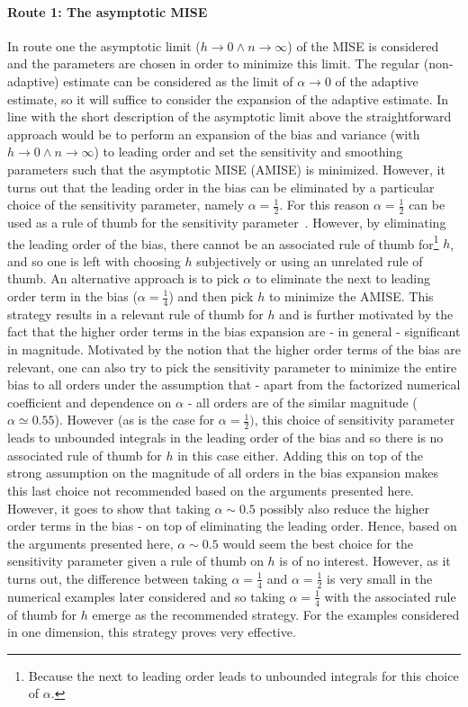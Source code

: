 \documentclass[
twoside,
openright,
titlepage,
numbers=noenddot,
headinclude,%
footinclude=true,
dottedtoc, %
ngerman,
american, %
pagesize=pdftex,
]{book}
\begin{document}
	\paragraph{Route 1: The asymptotic MISE}
	In route one the asymptotic limit ($h\rightarrow 0\wedge  n\rightarrow \infty$) of the MISE is considered and the parameters are chosen in order to minimize this limit. The regular (non-adaptive) estimate can be considered as the limit of $\alpha\rightarrow 0$ of the adaptive estimate, so it will suffice to consider the expansion of the adaptive estimate.\newline
	In line with the short description of the asymptotic limit above the straightforward approach would be to perform an expansion of the bias and variance (with $h\rightarrow 0\wedge  n\rightarrow \infty$) to leading order and set the sensitivity and smoothing parameters such that the asymptotic MISE (AMISE) is minimized. However, it turns out that the leading order in the bias can be eliminated by a particular choice of the sensitivity parameter, namely $\alpha=\frac{1}{2}$. For this reason $\alpha=\frac{1}{2}$ can be used as a rule of thumb for the sensitivity parameter~\citep{Silverman86}. However, by eliminating the leading order of the bias, there cannot be an associated rule of thumb for\footnote{Because the next to leading order leads to unbounded integrals for this choice of $\alpha$.} $h$, and so one is left with choosing $h$ subjectively or using an unrelated rule of thumb. An alternative approach is to pick $\alpha$ to eliminate the next to leading order term in the bias ($\alpha=\frac{1}{4}$) and then pick $h$ to minimize the AMISE. This strategy results in a relevant rule of thumb for $h$ and is further motivated by the fact that the higher order terms in the bias expansion are - in general - significant in magnitude. Motivated by the notion that the higher order terms of the bias are relevant, one can also try to pick the sensitivity parameter to minimize the entire bias to all orders under the assumption that - apart from the factorized numerical coefficient and dependence on $\alpha$ - all orders are of the similar magnitude ($\alpha \simeq 0.55$). However (as is the case for $\alpha=\frac{1}{2})$, this choice of sensitivity parameter leads to unbounded integrals in the leading order of the bias and so there is no associated rule of thumb for $h$ in this case either. Adding this on top of the strong assumption on the magnitude of all orders in the bias expansion makes this last choice not recommended based on the arguments presented here. However, it goes to show that taking $\alpha\sim 0.5$ possibly also reduce the higher order terms in the bias - on top of eliminating the leading order. Hence, based on the arguments presented here, $\alpha\sim 0.5$ would seem the best choice for the sensitivity parameter given a rule of thumb on $h$ is of no interest. However, as it turns out, the difference between taking $\alpha=\frac{1}{4}$ and $\alpha=\frac{1}{2}$ is very small in the numerical examples later considered and so taking $\alpha=\frac{1}{4}$ with the associated rule of thumb for $h$ emerge as the recommended strategy. For the examples considered in one dimension, this strategy proves very effective.\newline\newline
\end{document}
